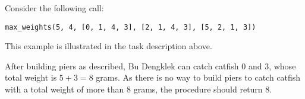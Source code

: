 Consider the following call:

\texttt{max_weights(5, 4, [0, 1, 4, 3], [2, 1, 4, 3], [5, 2, 1, 3])}

This example is illustrated in the task description above.

After building piers as described, Bu Dengklek can catch catfish $0$ and $3$, whose total weight is $5 + 3 = 8$ grams.
As there is no way to build piers to catch catfish with a total weight of more than $8$ grams, the procedure should return $8$.
